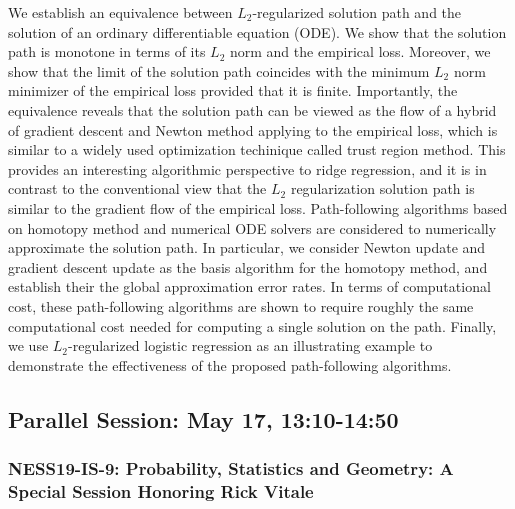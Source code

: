 \begin{itemize}
We establish an equivalence between $L_2$-regularized solution path and the solution of an ordinary differentiable equation (ODE). We show that the solution path is monotone in terms of its $L_2$ norm and the empirical loss. Moreover, we show that the limit of the solution path coincides with the minimum $L_2$ norm minimizer of the empirical loss provided that it is finite. Importantly, the equivalence reveals that the solution path can be viewed as the flow of a hybrid of gradient descent and Newton method applying to the empirical loss, which is similar to a widely used optimization techinique called trust region method. This provides an interesting algorithmic perspective to ridge regression, and it is in contrast to the conventional view that the $L_2$ regularization solution path is similar to the gradient flow of the empirical loss. Path-following algorithms based on homotopy method and numerical ODE solvers are considered to numerically approximate the solution path. In particular, we consider Newton update and gradient descent update as the basis algorithm for the homotopy method, and establish their the global approximation error rates. In terms of computational cost, these path-following algorithms are shown to require roughly the same computational cost needed for computing a single solution on the path. Finally, we use $L_2$-regularized logistic regression as an illustrating example to demonstrate the effectiveness of the proposed path-following algorithms.

\end{itemize}

\subsection*{Parallel Session: May 17, 13:10-14:50}

\subsubsection*{NESS19-IS-9: Probability, Statistics and Geometry: A Special Session Honoring Rick Vitale}

